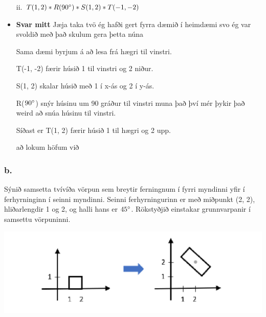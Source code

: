 \documentclass{article}
\begin{document}
\begin{itemize}
    \item[ii.] $T(1, 2)*R(90\degree)*S(1,2)*T(-1,-2)$

    \item \textbf{Svar mitt} Jæja taka tvö ég hafði gert fyrra dæmið í heimdæmi svo ég var svoldið með það skulum gera þetta núna 

    Sama dæmi byrjum á að lesa frá hægri til vinstri. 
    
    T(-1, -2) færir húsið 1 til vinstri og 2 niður.

    S(1, 2) skalar húsið með 1 í x-ás og 2 í y-ás.

    R($90\degree$) snýr húsinu um 90 gráður til vinstri muna það því mér þykir það weird að snúa húsinu til vinstri.

    Síðast er T(1, 2) færir húsið 1 til hægri og 2 upp.

    að lokum höfum við

\end{itemize}

\newpage

\subsubsection{b.} Sýnið samsetta tvívíða vörpun sem breytir ferningnum í fyrri myndinni yfir í
ferhyrninginn í seinni myndinni. Seinni ferhyrningurinn er með miðpunkt (2,
2), hliðarlengdir 1 og 2, og halli hans er $45\degree$. Rökstyðjið einstakar
grunnvarpanir í samsettu vörpuninni.

\includegraphics[scale = 0.9]{myndir/mynd2023b.png}
\end{document}
